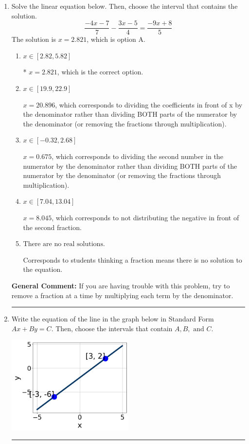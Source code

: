 \documentclass{extbook}[14pt]
\newcommand{\litem}[1]{\item #1

\rule{\textwidth}{0.4pt}}
\begin{document}
\begin{enumerate}\litem{
Solve the linear equation below. Then, choose the interval that contains the solution.
\[ \frac{-4x -7}{7} - \frac{3x -5}{4} = \frac{-9x + 8}{5} \]The solution is \( x = 2.821 \), which is option A.\begin{enumerate}[label=\Alph*.]
\item \( x \in [2.82, 5.82] \)

* $x = 2.821$, which is the correct option.
\item \( x \in [19.9, 22.9] \)

 $x = 20.896$, which corresponds to dividing the coefficients in front of x by the denominator rather than dividing BOTH parts of the numerator by the denominator (or removing the fractions through multiplication).
\item \( x \in [-0.32, 2.68] \)

 $x = 0.675$, which corresponds to dividing the second number in the numerator by the denominator rather than dividing BOTH parts of the numerator by the denominator (or removing the fractions through multiplication).
\item \( x \in [7.04, 13.04] \)

 $x = 8.045$, which corresponds to not distributing the negative in front of the second fraction.
\item \( \text{There are no real solutions.} \)

Corresponds to students thinking a fraction means there is no solution to the equation.
\end{enumerate}

\textbf{General Comment:} If you are having trouble with this problem, try to remove a fraction at a time by multiplying each term by the denominator.
}
\litem{
Write the equation of the line in the graph below in Standard Form $Ax+By=C$. Then, choose the intervals that contain $A, B, \text{ and } C$.

\begin{center}
    \includegraphics[width=0.5\textwidth]{../Figures/linearGraphToStandardCopyB.png}
\end{center}


}
\end{enumerate}
\end{document}

